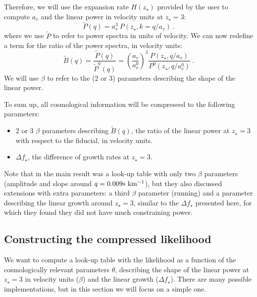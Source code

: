 Therefore, we will use the expansion rate $H(z_\star)$ provided by the user
to compute $a_v$ and the linear power in velocity units at $z_\star=3$:
\begin{equation}
 \tilde P(q) = a_v^3 ~ P(z_\star, k= q / a_v) ~.
\end{equation}
where we use $\tilde P$ to refer to power spectra in units of velocity.
We can now redefine a term for the ratio of the power spectra, in velocity
units:
\begin{equation}
 \tilde B(q) = \frac{\tilde P(q)}{\tilde P^0(q)} 
  = \left(\frac{a_v}{a_v^0}\right)^3 
      \frac{P(z_\star, q / a_v)}{P^0(z_\star, q / a_v^0)} ~.
\end{equation}
We will use $\beta$ to refer to the (2 or 3) parameters describing the shape
of the linear power.

To sum up, all cosmological information will be compreseed to the following
parameters:
\begin{itemize}
 \item 2 or 3 $\beta$ parameters describing $\tilde B(q)$, the ratio of 
  the linear power at $z_\star=3$ with respect to the fiducial, in velocity
  units.
 \item $\Delta f_\star$, the difference of growth rates at $z_\star=3$.
\end{itemize}


Note that in \cite{McDonald2005a} the main result was a look-up table with
only two $\beta$ parameters (amplitude and slope around $q = 0.009 {\rm s~km^{-1}}$),
but they also discussed extensions with extra parameters: a third $\beta$ 
parameter (running) and a parameter describing the linear growth around 
$z_\star=3$, similar to the $\Delta f_\star$ presented here, for which
they found they did not have much constraining power.


\subsection{Constructing the compressed likelihood}

We want to compute a look-up table with the likelihood as a function of the
cosmologically relevant parameters $\theta$, describing the shape of the
linear power at $z_\star=3$ in velocity units ($\beta$) and the linear growth
($\Delta f_\star$).
There are many possible implementations, but in this section we will focus
on a simple one. 

